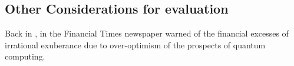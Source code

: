 \subsection{Other Considerations for evaluation}

Back in \citeyear{Ft:Gournianov:2022} \citeauthor{Ft:Gournianov:2022}, in the Financial Times newspaper \cite{Ft:Gournianov:2022}
warned of the financial excesses of irrational exuberance due to over-optimism of the prospects of quantum computing.  
